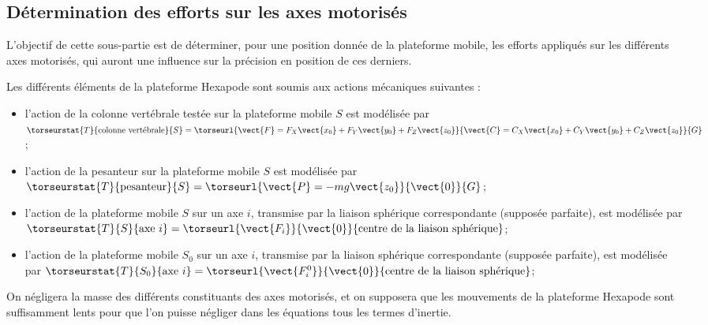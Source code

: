 \ifprof
\begin{corrige}
\end{corrige}
\else
\fi

\subsection{Détermination des efforts sur les axes motorisés}
\begin{obj}
L’objectif de cette sous-partie est de déterminer, pour une position donnée de la plateforme mobile, les
efforts appliqués sur les différents axes motorisés, qui auront une influence sur la précision en position
de ces derniers.
\end{obj}


Les différents éléments de la plateforme Hexapode sont soumis aux actions mécaniques suivantes :
\begin{itemize}
\item l’action de la colonne vertébrale testée sur la plateforme mobile $S$ est modélisée par 
$\torseurstat{T}{\text{colonne vertébrale}}{S} = 
\torseurl{\vect{F}=F_X\vect{x_0}+F_Y\vect{y_0}+F_Z\vect{z_0}}
{\vect{C}=C_X\vect{x_0}+C_Y\vect{y_0}+C_Z\vect{z_0}}{G}$;
\item l’action de la pesanteur sur la plateforme mobile $S$ est modélisée par 
$\torseurstat{T}{\text{pesanteur}}{S} = \torseurl{\vect{P}=-mg\vect{z_0}}{\vect{0}}{G}$;
\item l'action de la plateforme mobile $S$ sur un axe $i$, transmise par la liaison sphérique correspondante (supposée parfaite), est modélisée par
$\torseurstat{T}{S}{\text{axe } i} = \torseurl{\vect{F_i}}{\vect{0}}{\text{centre de la liaison sphérique}}$;
\item l'action de la plateforme mobile $S_0$ sur un axe $i$, transmise par la liaison sphérique correspondante (supposée parfaite), est modélisée par
$\torseurstat{T}{S_0}{\text{axe } i} = \torseurl{\vect{F_i^0}}{\vect{0}}{\text{centre de la liaison sphérique}}$;
\end{itemize}

On négligera la masse des différents constituants des axes motorisés, et on supposera que les mouvements de la
plateforme Hexapode sont suffisamment lents pour que l’on puisse négliger dans les équations tous les termes
d’inertie.

